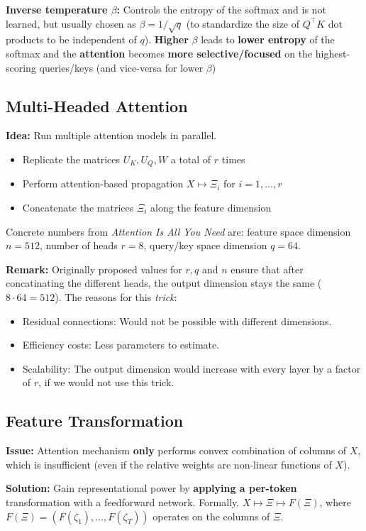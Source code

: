 \textbf{Inverse temperature $\beta$:} Controls the entropy of the softmax and is not learned, but usually chosen as $\beta = 1/\sqrt{q}$ (to standardize the size of $Q^{\intercal}K$ dot products to be independent of $q$). \textbf{Higher} $\beta$ leads to \textbf{lower entropy} of the softmax and the \textbf{attention} becomes \textbf{more selective/focused} on the highest-scoring queries/keys (and vice-versa for lower $\beta$)


\subsection{Multi-Headed Attention}
\textbf{Idea:} Run multiple attention models in parallel. 
\begin{itemize}
    \item Replicate the matrices $U_K, U_Q, W$ a total of $r$ times
    \item Perform attention-based propagation $X \mapsto \Xi_i$ for $i = 1, \dots, r$
    \item Concatenate the matrices $\Xi_i$ along the feature dimension
\end{itemize}
Concrete numbers from \textit{Attention Is All You Need} are: feature space dimension $n = 512$, number of heads $r = 8$, query/key space dimension $q = 64$. 


\textbf{Remark:} Originally proposed values for $r, q$ and $n$ ensure that after concatinating the different heads, the output dimension stays the same ($8 \cdot 64=512$). The reasons for this \textit{trick}: 
\begin{itemize}
    \item Residual connections: Would not be possible with different dimensions.
    \item Efficiency costs: Less parameters to estimate.
    \item Scalability: The output dimension would increase with every layer by a factor of $r$, if we would not use this trick.
\end{itemize}


\subsection{Feature Transformation}
\textbf{Issue:} Attention mechanism \textbf{only} performs convex combination of columns of $X$, which is insufficient (even if the relative weights are non-linear functions of $X$). 


\textbf{Solution:} Gain representational power by \textbf{applying a per-token} transformation with a feedforward network. Formally, $X \mapsto \Xi \mapsto F(\Xi)$, where $F(\Xi) = (F(\zeta_1), \dots, F(\zeta_T))$ operates on the columns of $\Xi$. 


